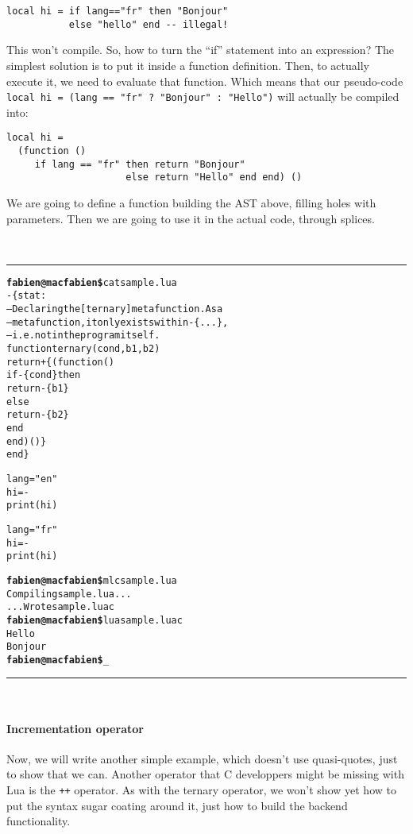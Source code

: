 \begin{verbatim}
local hi = if lang=="fr" then "Bonjour" 
           else "hello" end -- illegal!
\end{verbatim}

This won't compile. So, how to turn the ``if'' statement into an
expression? The simplest solution is to put it inside a function
definition. Then, to actually execute it, we need to evaluate that
function. Which means that our pseudo-code
\verb|local hi = (lang == "fr" ? "Bonjour" : "Hello")| will 
actually be compiled into:

\begin{verbatim}
local hi = 
  (function ()
     if lang == "fr" then return "Bonjour"
                     else return "Hello" end end) ()
\end{verbatim}

We are going to define a function building the AST above, filling
holes with parameters. Then we are going to use it in the actual code,
through splices.

~\\\hrule
\begin{alltt}
{\bf{}fabien@macfabien\$} cat sample.lua
-\{stat:
  -- Declaring the [ternary] metafunction. As a 
  -- metafunction, it only exists within -\{...\}, 
  -- i.e. not in the program itself.
  function ternary (cond, b1, b2)
     return +\{ (function() 
                    if -\{cond\} then
                       return -\{b1\} 
                    else
                       return -\{b2\}
                    end
                 end)() \}
  end \}

lang = "en"
hi = -
print (hi)

lang = "fr"
hi = -
print (hi)

{\bf{}fabien@macfabien\$} mlc sample.lua
Compiling sample.lua...
...Wrote sample.luac
{\bf{}fabien@macfabien\$} lua sample.luac
Hello
Bonjour
{\bf{}fabien@macfabien\$} _
\end{alltt}
\hrule~\\

\paragraph{Incrementation operator}
Now, we will write another simple example, which doesn't use
quasi-quotes, just to show that we can. Another operator that C
developpers might be missing with Lua is the \verb|++| operator. As
with the ternary operator, we won't show yet how to put the syntax
sugar coating around it, just how to build the backend functionality.

